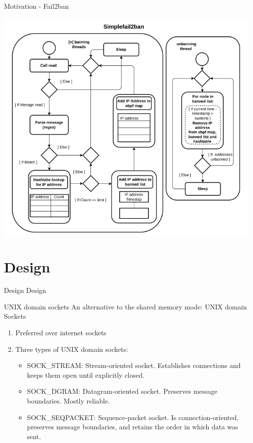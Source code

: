 \documentclass[11pt,english,table,dvipsnames]{beamer}
\begin{document}
\begin{frame}{Motivation - Fail2ban}
    \begin{center}
        \includegraphics[width=0.6\linewidth]{images/Simplefail2ban_Design.PNG}
    \end{center}

    \let\thefootnote\relax{}
\end{frame}

\section{Design}
\begin{frame}{Design}
    Design
\end{frame}

\begin{frame}{UNIX domain sockets}
    An alternative to the shared memory mode\@: UNIX domain Sockets
    \\
    \begin{enumerate}
        \item Preferred over internet sockets
        \item Three types of UNIX domain sockets\@:
            \begin{itemize}
                \item SOCK\_STREAM\@: Stream-oriented socket. Establishes connections and keeps them open until explicitly closed.
                \item SOCK\_DGRAM\@: Datagram-oriented socket. Preserves message boundaries. Mostly reliable.
                \item SOCK\_SEQPACKET\@: Sequence-packet socket. Is connection-oriented, preserves message boundaries, and retains the order in which data was sent.
            \end{itemize}
    \end{enumerate}
\end{frame}
\end{document}
